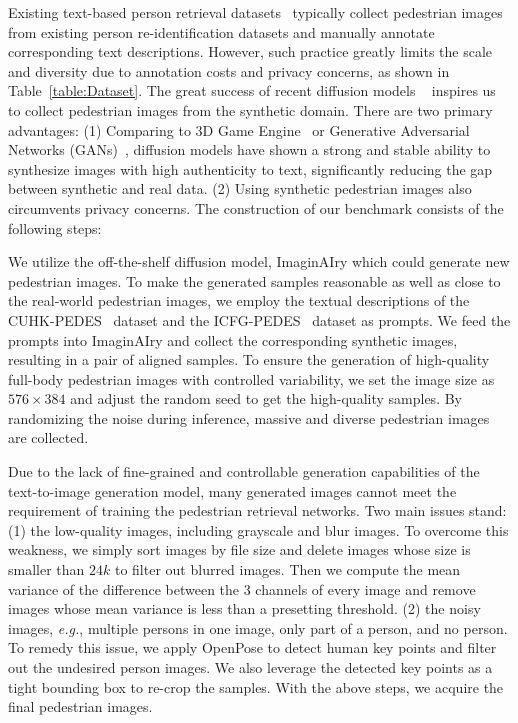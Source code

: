 \documentclass[sigconf]{acmart}
\def\eg{\emph{e.g.}}
\begin{document}
Existing text-based person retrieval datasets~\cite{li2017person, ding2021semantically, zhu2021dssl} typically collect pedestrian images from existing person re-identification datasets and manually annotate corresponding text descriptions. However, such practice greatly limits the scale and diversity due to annotation costs and privacy concerns, as shown in Table~\ref{table:Dataset}.
The great success of recent diffusion models ~\cite{rombach2022high,brooks2022instructpix2pix, hertz2022prompt} inspires us to collect pedestrian images from the synthetic domain. 
There are two primary advantages: 
(1) Comparing to 3D Game Engine~\cite{sun2019dissecting,xiang2021less,wang2020surpassing} or Generative Adversarial Networks (GANs)~\cite{zheng2017unlabeled,tang2019cycle,zheng2019joint,jiang2021exploring}, diffusion models have shown a strong and stable ability to synthesize images with high authenticity to text, significantly reducing the gap between synthetic and real data. (2) Using synthetic pedestrian images also circumvents privacy concerns. The construction of our benchmark consists of the following steps:


We utilize the off-the-shelf diffusion model, ImaginAIry \cite{imaginAIry} which could generate new pedestrian images. 
To make the generated samples reasonable as well as close to the real-world pedestrian images, we employ the textual descriptions of the CUHK-PEDES~\cite{li2017person} dataset and the ICFG-PEDES~\cite{ding2021semantically} dataset as prompts. 
We feed the prompts into ImaginAIry and collect the corresponding synthetic images, resulting in a pair of aligned samples. To ensure the generation of high-quality full-body pedestrian images with controlled variability, we set the image size as $576 \times 384$ and adjust the random seed to get the high-quality samples. By randomizing the noise during inference, massive and diverse pedestrian images are collected. 


\label{sec: postprocessing}
Due to the lack of fine-grained and controllable generation capabilities of the text-to-image generation model, many generated images cannot meet the requirement of training the pedestrian retrieval networks. Two main issues stand: (1) the low-quality images, including grayscale and blur images. 
To overcome this weakness, we simply sort images by file size and delete images whose size is smaller than $24k$ to filter out blurred images. Then we compute the mean variance of the difference between the 3 channels of every image and remove images whose mean variance is less than a presetting threshold.
(2) the noisy images, \eg, multiple persons in one image, only part of a person, and no person. To remedy this issue, we apply OpenPose \cite{8765346, simon2017hand, cao2017realtime, wei2016cpm} to detect human key points and filter out the undesired person images. We also leverage the detected key points as a tight bounding box to re-crop the samples. With the above steps, we acquire the final pedestrian images.
\end{document}
